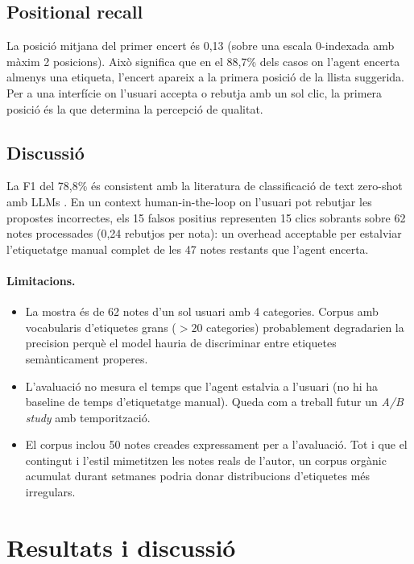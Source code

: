\subsection{Positional recall}

La posició mitjana del primer encert és 0{,}13 (sobre una escala 0-indexada amb màxim 2 posicions). Això significa que en el 88{,}7\% dels casos on l'agent encerta almenys una etiqueta, l'encert apareix a la primera posició de la llista suggerida. Per a una interfície on l'usuari accepta o rebutja amb un sol clic, la primera posició és la que determina la percepció de qualitat.

\subsection{Discussió}

La F1 del 78{,}8\% és consistent amb la literatura de classificació de text zero-shot amb LLMs \parencite{willison2025trifecta}. En un context human-in-the-loop on l'usuari pot rebutjar les propostes incorrectes, els 15 falsos positius representen 15 clics sobrants sobre 62 notes processades (0{,}24 rebutjos per nota): un overhead acceptable per estalviar l'etiquetatge manual complet de les 47 notes restants que l'agent encerta.

\paragraph{Limitacions.}
\begin{itemize}
    \item La mostra és de 62 notes d'un sol usuari amb 4 categories. Corpus amb vocabularis d'etiquetes grans ($> 20$ categories) probablement degradarien la precision perquè el model hauria de discriminar entre etiquetes semànticament properes.
    \item L'avaluació no mesura el temps que l'agent estalvia a l'usuari (no hi ha baseline de temps d'etiquetatge manual). Queda com a treball futur un \emph{A/B study} amb temporització.
    \item El corpus inclou 50 notes creades expressament per a l'avaluació. Tot i que el contingut i l'estil mimetitzen les notes reals de l'autor, un corpus orgànic acumulat durant setmanes podria donar distribucions d'etiquetes més irregulars.
\end{itemize}

\section{Resultats i discussió}
\label{sec:resultats-globals}

